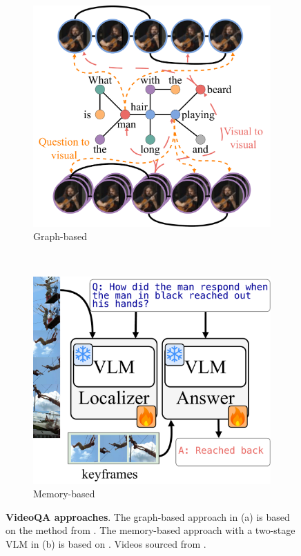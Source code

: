 \begin{figure}[t!]
    \centering
    \begin{subfigure}[t]{0.5\linewidth}
        \centering
        \includegraphics[width=\textwidth]{figs/graph_vqa.pdf}
        \caption{Graph-based}
    \end{subfigure}%
    ~ 
    \begin{subfigure}[t]{0.5\linewidth}
        \centering
        \includegraphics[width=\textwidth]{figs/vlm_vqa.pdf}
        \caption{Memory-based}
    \end{subfigure}
    \caption{\textbf{VideoQA approaches}. The graph-based approach in (a) is based on the method from \citet{park2021bridge}. The memory-based approach with a two-stage VLM in (b) is based on \citet{yu2023self}. Videos sourced from \citet{xiao2021next}.}
    \label{fig:videoqa}
\end{figure}



